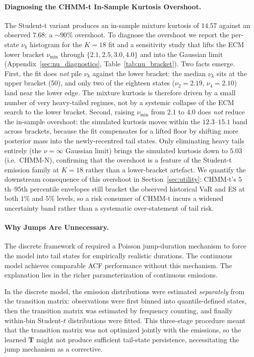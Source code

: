 \paragraph{Diagnosing the CHMM-t In-Sample Kurtosis Overshoot.}
The Student-t variant produces an in-sample mixture kurtosis of $14.57$ against an observed $7.68$: a $\sim 90\%$ overshoot.
To diagnose the overshoot we report the per-state $\nu_k$ histogram for the $K = 18$ fit and a sensitivity study that lifts the ECM lower bracket $\nu_{\min}$ through $\{2.1, 2.5, 3.0, 4.0\}$ and into the Gaussian limit (Appendix~\ref{sec:nu_diagnostics}, Table~\ref{tab:nu_bracket}).
Two facts emerge.
First, the fit does \emph{not} pile $\nu_k$ against the lower bracket: the median $\nu_k$ sits at the upper bracket (50), and only two of the eighteen states ($\nu_2 = 2.19$, $\nu_4 = 2.10$) land near the lower edge.
The mixture kurtosis is therefore driven by a small number of very heavy-tailed regimes, not by a systemic collapse of the ECM search to the lower bracket.
Second, raising $\nu_{\min}$ from $2.1$ to $4.0$ does \emph{not} reduce the in-sample overshoot: the simulated kurtosis moves within the $12.3$--$15.1$ band across brackets, because the fit compensates for a lifted floor by shifting more posterior mass into the newly-recentred tail states.
Only eliminating heavy tails entirely (the $\nu = \infty$ Gaussian limit) brings the simulated kurtosis down to $5.03$ (i.e.\ CHMM-N), confirming that the overshoot is a feature of the Student-t emission family at $K = 18$ rather than a lower-bracket artefact.
We quantify the downstream consequence of this overshoot in Section~\ref{sec:utility}: CHMM-t's $5$th--$95$th percentile envelopes still bracket the observed historical VaR and ES at both $1\%$ and $5\%$ levels, so a risk consumer of CHMM-t incurs a widened uncertainty band rather than a systematic over-statement of tail risk.

\paragraph{Why Jumps Are Unnecessary.}
The discrete framework of \citet{alswaidan2026hybrid} required a Poisson jump-duration mechanism to force the model into tail states for empirically realistic durations.
The continuous model achieves comparable ACF performance without this mechanism.
The explanation lies in the richer parameterization of continuous emissions.

In the discrete model, the emission distributions were estimated \emph{separately} from the transition matrix: observations were first binned into quantile-defined states, then the transition matrix was estimated by frequency counting, and finally within-bin Student-$t$ distributions were fitted.
This three-stage procedure meant that the transition matrix was not optimized jointly with the emissions, so the learned $\mathbf{T}$ might not produce sufficient tail-state persistence, necessitating the jump mechanism as a corrective.

